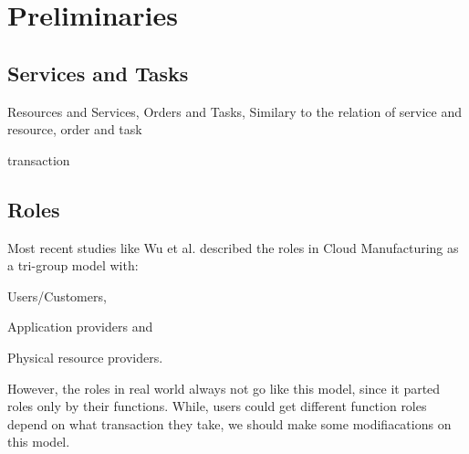 \section{Preliminaries} %
 
\subsection{Services and Tasks}
Resources and Services, Orders and Tasks,
Similary to the relation of service and resource, order and task 

transaction

\subsection{Roles}
Most recent studies like Wu et al.\cite{Wu2013} described the roles in Cloud Manufacturing as a tri-group model with:\begin{inparaenum}[1)]
\item Users/Customers,
\item Application providers and
\item Physical resource providers.
\end{inparaenum}
However, the roles in real world always not go like this model, since it parted roles only by their functions. While, users could get different function roles depend on what transaction they take, we should make some modifiacations on this model.

